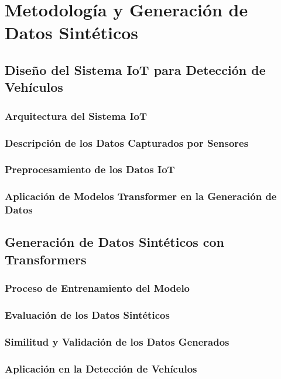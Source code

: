 \chapter{Metodología y Generación de Datos Sintéticos}

\section{Diseño del Sistema IoT para Detección de Vehículos}
\subsection{Arquitectura del Sistema IoT}
\subsection{Descripción de los Datos Capturados por Sensores}
\subsection{Preprocesamiento de los Datos IoT}
\subsection{Aplicación de Modelos Transformer en la Generación de Datos}

\section{Generación de Datos Sintéticos con Transformers}
\subsection{Proceso de Entrenamiento del Modelo}
\subsection{Evaluación de los Datos Sintéticos}
\subsection{Similitud y Validación de los Datos Generados}
\subsection{Aplicación en la Detección de Vehículos}